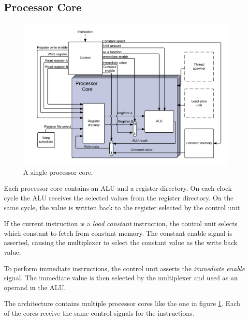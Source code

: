 \subsection{Processor Core}

\begin{figure}[H]
	\centering
	\includegraphics[width=1.2\textwidth]{../gpu/diagrams/processor_core.png}
	\caption{A single processor core.}
	\label{fig:processor_core}
\end{figure}

Each processor core contains an ALU and a register directory.
On each clock cycle the ALU receives the selected values from the register directory.
On the same cycle, the value is written back to the register selected by the control unit.

If the current instruction is a \emph{load constant} instruction, the control unit selects which constant to fetch from constant memory.
The constant enable signal is asserted, causing the multiplexer to select the constant value as the write back value.

To perform immediate instructions, the control unit asserts the \emph{immediate enable} signal.
The immediate value is then selected by the multiplexer and used as an operand in the ALU.

The architecture contains multiple processor cores like the one in figure \ref{fig:processor_core}.
Each of the cores receive the same control signals for the instructions.